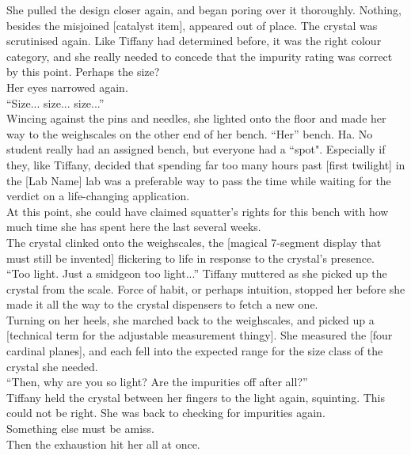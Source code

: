 She pulled the design closer again, and began poring over it thoroughly.
Nothing, besides the misjoined [catalyst item], appeared out of place.
The crystal was scrutinised again.
Like Tiffany had determined before, it was the right colour category, and she really needed to concede that the impurity rating was correct by this point.
Perhaps the size?\\

Her eyes narrowed again.\\

``Size... size... size...''\\

Wincing against the pins and needles, she lighted onto the floor and made her way to the weighscales on the other end of her bench. 
``Her'' bench. Ha.
No student really had an assigned bench, but everyone had a ``spot".
Especially if they, like Tiffany, decided that spending far too many hours past [first twilight] in the [Lab Name] lab was a preferable way to pass the time while waiting for the verdict on a life-changing application.\\

At this point, she could have claimed squatter's rights for this bench with how much time she has spent here the last several weeks.\\

The crystal clinked onto the weighscales, the [magical 7-segment display that must still be invented] flickering to life in response to the crystal's presence.\\

``Too light. Just a smidgeon too light...'' Tiffany muttered as she picked up the crystal from the scale. 
Force of habit, or perhaps intuition, stopped her before she made it all the way to the crystal dispensers to fetch a new one.\\

Turning on her heels, she marched back to the weighscales, and picked up a [technical term for the adjustable measurement thingy]. 
She measured the [four cardinal planes], and each fell into the expected range for the size class of the crystal she needed.\\

``Then, why are you so light? Are the impurities off after all?''\\

Tiffany held the crystal between her fingers to the light again, squinting.
This could not be right.
She was back to checking for impurities again.\\

Something else must be amiss.\\

Then the exhaustion hit her all at once.\\
